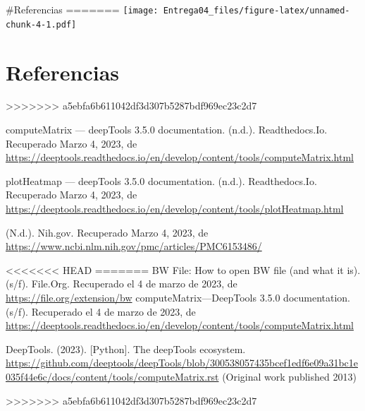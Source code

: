 \documentclass[
]{article}
\begin{document}
\#Referencias
=======
\texttt{[image: Entrega04\_files/figure-latex/unnamed-chunk-4-1.pdf]}

\hypertarget{referencias}{%
\section{Referencias}\label{referencias}}
>>>>>>> a5ebfa6b611042df3d307b5287bdf969ec23c2d7

computeMatrix --- deepTools 3.5.0 documentation. (n.d.). Readthedocs.Io.
Recuperado Marzo 4, 2023, de
\url{https://deeptools.readthedocs.io/en/develop/content/tools/computeMatrix.html}

plotHeatmap --- deepTools 3.5.0 documentation. (n.d.). Readthedocs.Io.
Recuperado Marzo 4, 2023, de
\url{https://deeptools.readthedocs.io/en/develop/content/tools/plotHeatmap.html}

(N.d.). Nih.gov. Recuperado Marzo 4, 2023, de
\url{https://www.ncbi.nlm.nih.gov/pmc/articles/PMC6153486/}

<<<<<<< HEAD
=======
BW File: How to open BW file (and what it is). (s/f). File.Org.
Recuperado el 4 de marzo de 2023, de \url{https://file.org/extension/bw}
computeMatrix---DeepTools 3.5.0 documentation. (s/f). Recuperado el 4 de
marzo de 2023, de
\url{https://deeptools.readthedocs.io/en/develop/content/tools/computeMatrix.html}

DeepTools. (2023). {[}Python{]}. The deepTools ecosystem.
\url{https://github.com/deeptools/deepTools/blob/300538057435bcef1edf6e09a31bc1e035f44e6c/docs/content/tools/computeMatrix.rst}
(Original work published 2013)

>>>>>>> a5ebfa6b611042df3d307b5287bdf969ec23c2d7
\end{document}
